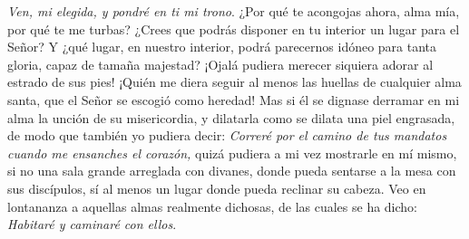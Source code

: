 \begin{body}
	\emph{Ven, mi elegida, y pondré en ti mi trono}. ¿Por qué te acongojas ahora, alma mía, por qué te me turbas? ¿Crees que podrás disponer en tu interior un lugar para el Señor? Y ¿qué lugar, en nuestro interior, podrá parecernos idóneo para tanta gloria, capaz de tamaña majestad? ¡Ojalá pudiera merecer siquiera adorar al estrado de sus pies! ¡Quién me diera seguir al menos las huellas de cualquier alma santa, que el Señor se escogió como heredad! Mas si él se dignase derramar en mi alma la unción de su misericordia, y dilatarla como se dilata una piel engrasada, de modo que también yo pudiera decir: \emph{Correré por el camino de tus mandatos cuando me ensanches el corazón,} quizá pudiera a mi vez mostrarle en mí mismo, si no una sala grande arreglada con divanes, donde pueda sentarse a la mesa con sus discípulos, sí al menos un lugar donde pueda reclinar su cabeza. Veo en lontananza a aquellas almas realmente dichosas, de las cuales se ha dicho: \emph{Habitaré y caminaré con ellos}.
\end{body}